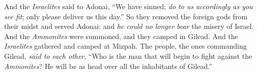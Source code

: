 \begin{biblechapter}
\verse And the \textit{Israelites} said to Adonai, “We have sinned; \textit{do to us accordingly as you see fit}; only please deliver us this day.”
\verse So they removed the foreign gods from their midst and served Adonai; and \textit{he could no longer bear} the misery of Israel.
\verse And the \textit{Ammonites} were summoned, and they camped in Gilead. And the \textit{Israelites} gathered and camped at Mizpah.
\verse The people, the ones commanding Gilead, \textit{said to each other}, “Who is the man that will begin to fight against the \textit{Ammonites}? He will be as head over all the inhabitants of Gilead.”
\end{biblechapter}

